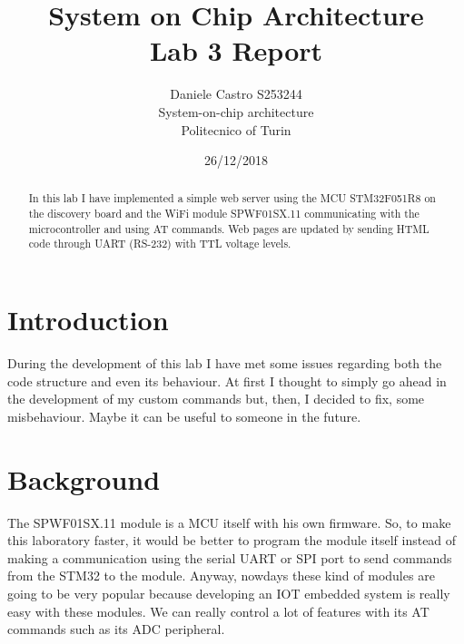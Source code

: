 \documentclass[peerreview]{IEEEtran}
\begin{document}
\title{System on Chip Architecture \\ Lab 3 Report}


\author{Daniele Castro S253244\\
System-on-chip architecture\\
Politecnico of Turin\\
}
\date{26/12/2018}

\maketitle
\tableofcontents
\listoffigures

\IEEEpeerreviewmaketitle
\begin{abstract}
In this lab I have implemented a simple web server using the MCU STM32F051R8 on the discovery board and the WiFi module SPWF01SX.11 communicating with the microcontroller and using AT commands. Web pages are updated by sending HTML code through UART (RS-232) with TTL voltage levels.
\end{abstract}
\section{Introduction}
During the development of this lab I have met some issues regarding both the code structure and even its behaviour. At first I thought to simply go ahead in the development of my custom commands but, then, I decided to fix, some misbehaviour. Maybe it can be useful to someone in the future.
\section{Background}
The SPWF01SX.11 module is a MCU itself with his own firmware. So, to make this laboratory faster,  it would be better to program the module itself instead of making a communication using the serial UART or SPI port to send commands from the STM32 to the module. Anyway, nowdays these kind of modules are going to be very popular because developing an IOT embedded system is really easy with these modules. We can really control a lot of features with its AT commands such as its ADC peripheral.
\end{document}
